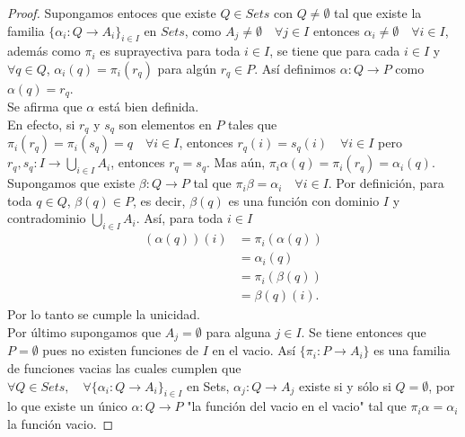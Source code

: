 \documentclass{article}
\begin{document}
\begin{enumerate}[label=\textbf{Ej \arabic*.}]
\begin{proof}
Supongamos entoces que existe $Q\in Sets$ con $Q\neq \emptyset$ tal que existe la familia $\{\alpha_i:Q\to A_i\}_{i\in I}$ en $Sets$, 
como $A_j\neq \emptyset\quad \forall j\in I$
entonces $\alpha_i\neq \emptyset\quad \forall i\in I$, además como $\pi_i$ es suprayectiva
para toda $i\in I$, se tiene que para cada $i\in I$ y $\forall q\in Q$, $\alpha_i(q)=\pi_i(r_q)$ para algún $r_q\in P$. 
Así definimos $\alpha:Q\to P$ como $\alpha(q)=r_q$.\\

Se afirma que $\alpha$ está bien definida.\\
En efecto, si $r_q$ y $s_q$ son elementos en $P$ tales que \\$\pi_i(r_q)=\pi_i(s_q)=q\quad \forall i\in I$, entonces $r_q(i)=s_q(i)\quad \forall i\in I$
pero \\$r_q,s_q:I\to \displaystyle\bigcup_{i\in I}A_i$, entonces $r_q=s_q$. Mas aún, $\pi_i\alpha(q)=\pi_i(r_q)=\alpha_i(q).$\\

Supongamos que existe $\beta:Q\to P$ tal que $\pi_i\beta=\alpha_i\quad \forall i\in I$. Por definición, para toda $q\in Q$, $\beta(q)\in P$, 
es decir, $\beta(q)$ es una función con dominio $I$ y contradominio $ \displaystyle\bigcup_{i\in I}A_i$. Así, para toda $i\in I$
\begin{align*}
(\alpha(q))(i)&=\pi_i(\alpha(q))\\
&=\alpha_i(q)\\
&=\pi_i(\beta(q))\\
&=\beta(q)(i).
\end{align*}
Por lo tanto se cumple la unicidad.\\

Por último supongamos que $A_j=\emptyset$ para alguna $j\in I$. Se tiene entonces que $P=\emptyset$ pues no existen funciones de $I$ en el vacio.
Así $\{\pi_i:P\to A_i\}$ es una familia de funciones vacias las cuales cumplen que \\$\forall Q\in Sets,\quad \forall \{\alpha_i:Q\to A_i\}_{i\in I}$ en 
Sets, $\alpha_j:Q\to A_j$ existe si y sólo si $Q=\emptyset$, por lo que existe un único $\alpha:Q\to P$ "la función del vacio en el vacio" tal que 
$\pi_i\alpha=\alpha_i$ la función vacio.
\end{proof}


\end{enumerate}
\end{document}

